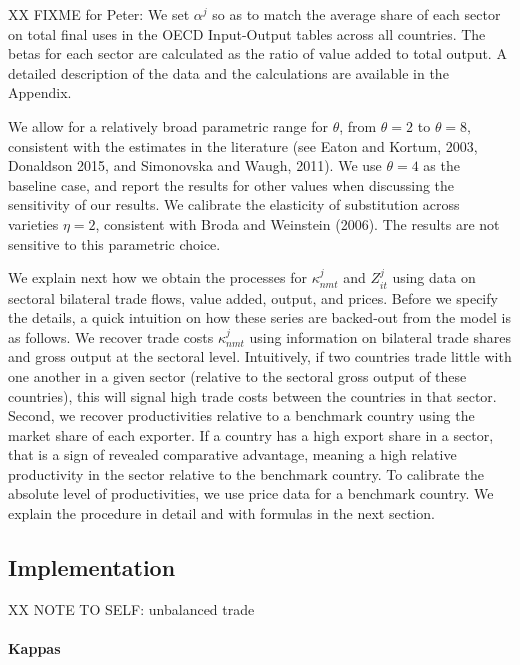 \documentclass[12pt]{article}
\begin{document}
XX FIXME for Peter: We set $\alpha ^{j}$ so as to match the average share of each sector on
total final uses in the OECD Input-Output tables across all countries. The
betas for each sector are calculated as the ratio of value added to total
output. A detailed description of the data and the calculations are
available in the Appendix.

We allow for a relatively broad parametric range for $\theta $, from $\theta
=2$ to $\theta =8,$ consistent with the estimates in the literature (see
Eaton and Kortum, 2003, Donaldson 2015, and Simonovska and Waugh, 2011). We
use $\theta =4$ as the baseline case, and report the results for other
values when discussing the sensitivity of our results. We calibrate the
elasticity of substitution across varieties $\eta =2$, consistent with Broda
and Weinstein (2006). The results are not sensitive to this parametric
choice.

We explain next how we obtain the processes for $\kappa _{nmt}^{j}$ and $%
Z_{it}^{j}$ using data on sectoral bilateral trade flows, value added,
output, and prices. Before we specify the details, a quick intuition on how
these series are backed-out from the model is as follows. We recover trade
costs $\kappa _{nmt}^{j}$ using information on bilateral trade shares and
gross output at the sectoral level. Intuitively, if two countries trade
little with one another in a given sector (relative to the sectoral gross
output of these countries), this will signal high trade costs between the
countries in that sector. Second, we recover productivities relative to a
benchmark country using the market share of each exporter. If a country has
a high export share in a sector, that is a sign of revealed comparative
advantage, meaning a high relative productivity in the sector relative to
the benchmark country. To calibrate the absolute level of productivities, we
use price data for a benchmark country. We explain the procedure in detail
and with formulas in the next section.

\subsection{Implementation}

XX NOTE TO SELF: unbalanced trade

\paragraph{Kappas}
\end{document}
